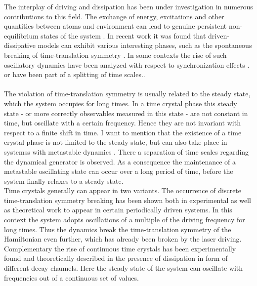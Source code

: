 The interplay of driving and dissipation has been under investigation in numerous contributions to this field. The exchange of energy, excitations and other quantities between atoms and environment can lead to genuine persistent non-equilibrium states of the system \cite{diehl_quantum_2008,diehl_dynamical_2010,cabot_metastable_2022,mattes_entangled_2023,krishna_measurement-induced_2023,jin_photon_2013,marcuzzi_absorbing_2016}. In recent work it was found that driven-dissipative models can exhibit various interesting phases, %
such as the spontaneous breaking of time-translation symmetry \cite{mattes_entangled_2023,krishna_measurement-induced_2023}. In some contexts the rise of such oscillatory dynamics have been analyzed with respect to synchronization effects \cite{cabot_quantum_2019,cabot_metastable_2021,giorgi_transient_2019,weiner_phase_2017}. 
or have been part of a splitting of time scales.\cite{labay-mora_quantum_2023}.\\\\
The violation of time-translation symmetry is usually related to the steady state, which the system occupies for long times. In a time crystal phase this steady state - or more correctly observables measured in this state - are not constant in time, but oscillate with a certain frequency. Hence they are not invariant with respect to a finite shift in time. I want to mention that the existence of a time crystal phase is not limited to the steady state, but can also take place in systemss with metastable dynamics \cite{else_prethermal_2017,gambetta_discrete_2019}. There a separation of time scales regarding the dynamical generator is observed. As a consequence the maintenance of a metastable oscillating state can occur over a long period of time, before the system finally relaxes to a steady state. \\Time crystals generally can appear in two variants. The occurrence of discrete time-translation symmetry breaking has been shown both in experimental  \cite{choi_observation_2017,zhang_observation_2017} as well as theoretical work \cite{yao_discrete_2017,sacha_time_2018} to appear in certain periodically driven systems. In this context the system adopts oscillations of a multiple of the driving frequency for long times. Thus the dynamics break the time-translation symmetry of the Hamiltonian even further, which has already been broken by the laser driving. Complementary the rise of continuous time crystals has been experimentally found \cite{kesler_emergent_2019} and theoretically described \cite{tucker_shattered_2018,iemini_boundary_2018,owen_quantum_2018} in the presence of dissipation in form of different decay channels. Here the steady state of the system can oscillate with frequencies out of a continuous set of values. 

